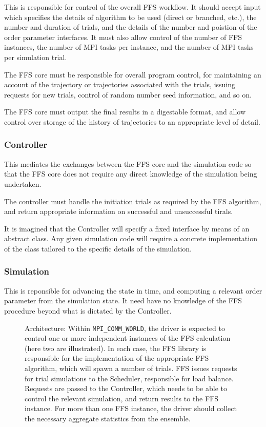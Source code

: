 \documentclass[11pt]{article}
\begin{document}
This is responsible for control of the overall FFS workflow. It should
accept input which specifies the details of algorithm to be used
(direct or branched, etc.), the number and duration of trials, and the
details of the number and poistion of the order parameter interfaces.
It must also allow control of the number of FFS instances, the number
of MPI tasks per instance, and the number of MPI tasks per simulation
trial.

The FFS core must be responsible for overall program control, for maintaining
an account of the trajectory or trajectories associated with the trials,  
issuing requests for new trials, control of random number seed information,
and so on.

The FFS core must output the final results in a digestable format, and
allow control over storage of the history of trajectories to an
appropriate level of detail.

\subsubsection{Controller}

This mediates the exchanges between the FFS core and the simulation
code so that the FFS core does not require any direct knowledge of
the simulation being undertaken.

The controller must handle the initiation trials as required by
the FFS algorithm, and return appropriate information on successful
and unsuccessful tirals.

It is imagined that the Controller will specify a fixed interface
by means of an abstract class. Any given simulation code will
require a concrete implementation of the class tailored to the
specific details of the simulation.

\subsubsection{Simulation}

This is reponsible for advancing the state in time, and computing
a relevant order parameter from the simulation state. It need have
no knowledge of the FFS procedure beyond what is dictated by the
Controller.

\begin{figure}[t]
\begin{center}

\end{center}
\caption{Architecture: Within \texttt{MPI\_COMM\_WORLD}, the driver
is expected to control one or more independent instances of the
FFS calculation (here two are illustrated). In each case, the FFS
library is responsible for the implementation of the appropriate
FFS algorithm, which will spawn a number of trials.
FFS issues requests for trial simulations to the Scheduler,
responsible for load balance. Requests are passed to the
Controller, which needs to be able to control the relevant
simulation, and return results to the FFS instance. For more than
one FFS instance, the driver
should collect the necessary aggregate statistics from the ensemble.}
\end{figure}
\end{document}
